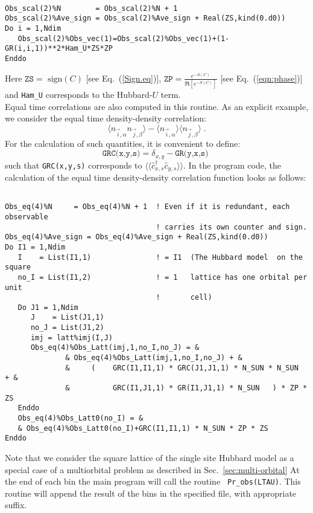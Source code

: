 \documentclass{SciPost}
\begin{document}
\begin{lstlisting} 

Obs_scal(2)%N        = Obs_scal(2)%N + 1
Obs_scal(2)%Ave_sign = Obs_scal(2)%Ave_sign + Real(ZS,kind(0.d0))
Do i = 1,Ndim
   Obs_scal(2)%Obs_vec(1)=Obs_scal(2)%Obs_vec(1)+(1-GR(i,i,1))**2*Ham_U*ZS*ZP
Enddo

\end{lstlisting} 
Here  $ \texttt{ZS} = \text{ sign} (C) $  [see Eq.~(\ref{Sign.eq})],  $ \texttt{ZP} =   \frac{e^{-S(C)}} {\Re \left[e^{-S(C)} \right]}   $ [see Eq.~(\ref{eqn:phase})] and  \texttt{Ham\_U}  corresponds to the Hubbard-$U$ term.\\
Equal time correlations  are also computed in this routine. As an explicit example, we  consider the equal time density-density correlation:
\begin{equation}
	 \langle n_{\vec{i},\alpha}   n_{\vec{j},\beta} \rangle   -  \langle n_{\vec{i},\alpha} \rangle  \langle    n_{\vec{j},\beta}  \rangle \;.
\end{equation} 
For the calculation of such quantities, it is convenient to  define: 
\begin{equation}
\label{GRC.eq}
	\texttt{GRC(x,y,s)}   =  \delta_{x,y}  - \texttt{GR(y,x,s)  }
\end{equation}
such that \texttt{GRC(x,y,s)}    corresponds to  $ \langle \langle  \hat{c}_{x,s}^{\dagger}\hat{c}_{y,s}^{\phantom\dagger} \rangle \rangle $. 
In the program code, the calculation of the equal time density-density correlation function looks as follows:
\begin{lstlisting} 

Obs_eq(4)%N     = Obs_eq(4)%N + 1  ! Even if it is redundant, each observable  
                                   ! carries its own counter and sign.
Obs_eq(4)%Ave_sign = Obs_eq(4)%Ave_sign + Real(ZS,kind(0.d0))  
Do I1 = 1,Ndim
   I    = List(I1,1)               ! = I1  (The Hubbard model  on the square
   no_I = List(I1,2)               ! = 1   lattice has one orbital per unit
                                   !       cell)
   Do J1 = 1,Ndim                       
      J    = List(J1,1)
      no_J = List(J1,2)
      imj = latt%imj(I,J)
      Obs_eq(4)%Obs_Latt(imj,1,no_I,no_J) = &
              & Obs_eq(4)%Obs_Latt(imj,1,no_I,no_J) + &
              &     (    GRC(I1,I1,1) * GRC(J1,J1,1) * N_SUN * N_SUN      + &
              &          GRC(I1,J1,1) * GR(I1,J1,1) * N_SUN   ) * ZP * ZS 
   Enddo
   Obs_eq(4)%Obs_Latt0(no_I) = &
   & Obs_eq(4)%Obs_Latt0(no_I)+GRC(I1,I1,1) * N_SUN * ZP * ZS
Enddo
\end{lstlisting} 
Note that we consider the  square lattice of the single site Hubbard model as a special case of a multiorbital problem as described in Sec.~\ref{sec:multi-orbital}
At the end of each bin  the main program will call the routine \texttt{ Pr\_obs(LTAU)}. This routine will append the result of the bins in the specified file,  with appropriate suffix. 
%
\end{document}
